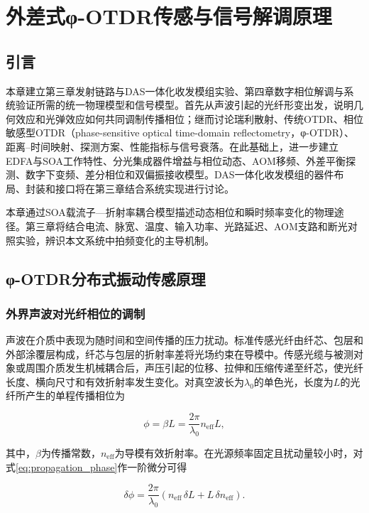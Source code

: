 \chapter{外差式φ-OTDR传感与信号解调原理}

\section{引言}

本章建立第三章发射链路与DAS一体化收发模组实验、第四章数字相位解调与系统验证所需的统一物理模型和信号模型。首先从声波引起的光纤形变出发，说明几何效应和光弹效应如何共同调制传播相位；继而讨论瑞利散射、传统OTDR、相位敏感型OTDR（phase-sensitive optical time-domain reflectometry，φ-OTDR）、距离--时间映射、探测方案、性能指标与信号衰落。在此基础上，进一步建立EDFA与SOA工作特性、分光集成器件增益与相位动态、AOM移频、外差平衡探测、数字下变频、差分相位和双偏振接收模型。DAS一体化收发模组的器件布局、封装和接口将在第三章结合系统实现进行讨论。

本章通过SOA载流子—折射率耦合模型描述动态相位和瞬时频率变化的物理途径。第三章将结合电流、脉宽、温度、输入功率、光路延迟、AOM支路和断光对照实验，辨识本文系统中拍频变化的主导机制。

\section{φ-OTDR分布式振动传感原理}

\subsection{外界声波对光纤相位的调制}

声波在介质中表现为随时间和空间传播的压力扰动。标准传感光纤由纤芯、包层和外部涂覆层构成，纤芯与包层的折射率差将光场约束在导模中。传感光缆与被测对象或周围介质发生机械耦合后，声压引起的位移、拉伸和压缩传递至纤芯，使光纤长度、横向尺寸和有效折射率发生变化。对真空波长为$\lambda_0$的单色光，长度为$L$的光纤所产生的单程传播相位为

\begin{equation}
\phi=\beta L=\frac{2\pi}{\lambda_0}n_{\mathrm{eff}}L,
\label{eq:propagation_phase}
\end{equation}

其中，$\beta$为传播常数，$n_{\mathrm{eff}}$为导模有效折射率。在光源频率固定且扰动量较小时，对式\eqref{eq:propagation_phase}作一阶微分可得

\begin{equation}
\delta\phi
=
\frac{2\pi}{\lambda_0}
\left(
n_{\mathrm{eff}}\,\delta L
+L\,\delta n_{\mathrm{eff}}
\right).
\label{eq:phase_total_differential}
\end{equation}

